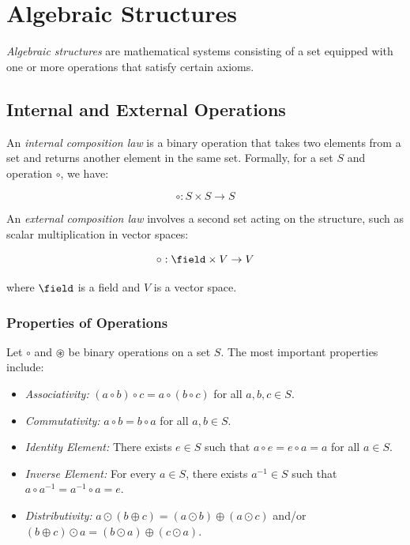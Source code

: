 \chapter{Algebraic Structures}

\emph{Algebraic structures} are mathematical systems consisting of a set equipped with one or more operations 
that satisfy certain axioms. 

\section{Internal and External Operations}

An \emph{internal composition law} is a binary operation that takes two elements from a set and returns another element in the same set. 
Formally, for a set \(S\) and operation \(\circ\), we have:

\[
  \circ: S \times S \to S
\]

An \emph{external composition law} involves a second set acting on the structure, such as scalar multiplication in vector spaces:

\[
  \circ: \field \times V \to V
\]

where \(\field\) is a field and \(V\) is a vector space.

\subsection{Properties of Operations}

Let \(\circ\) and \(\circledast\) be binary operations on a set \(S\). The most important properties include:

\begin{itemize}
    
    \item \emph{Associativity:} \((a \circ b) \circ c  = a \circ (b \circ c)\) for all \(a,b,c \in S\).
    
    \item \emph{Commutativity:} \(a \circ b = b \circ a\) for all \(a,b \in S\).
    
    \item \emph{Identity Element:} There exists \(e \in S\) such that \(a \circ e = e \circ a = a\) for all \(a \in S\).
    
    \item \emph{Inverse Element:} For every \(a \in S\), there exists \(a^{-1} \in S\) such that \(a \circ a^{-1} = a^{-1} \circ a = e\).
    
    \item \emph{Distributivity:} \(a \odot (b \oplus c) = (a \odot b) \oplus (a \odot c)\) and/or \((b \oplus c) \odot a = (b \odot a) \oplus 
    (c \odot a)\).

\end{itemize}

